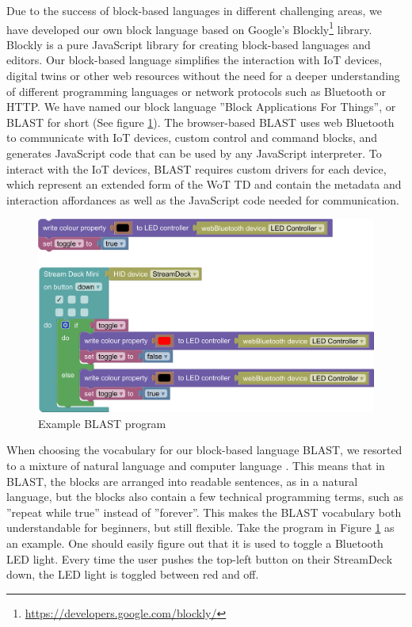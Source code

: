 \documentclass[runningheads]{llncs}
\begin{document}
Due to the success of block-based languages in different challenging areas, we have developed our own block language based on Google's Blockly\footnote{\url{https://developers.google.com/blockly/}} library. %
Blockly is a pure JavaScript library for creating block-based languages and editors.
Our block-based language simplifies the interaction with IoT devices, digital twins or other web resources without the need for a deeper understanding of different programming languages or network protocols such as Bluetooth or HTTP.
We have named our block language ''Block Applications For Things'', or BLAST for short (See figure \ref{fig1}).
The browser-based BLAST uses web Bluetooth to communicate with IoT devices, custom control and command blocks, and generates JavaScript code that can be used by any JavaScript interpreter.
To interact with the IoT devices, BLAST requires custom drivers for each device, which represent an extended form of the WoT TD %
 and contain the metadata and interaction affordances as well as the JavaScript code needed for communication.

\begin{figure}
\includegraphics[width=\textwidth]{screenshot.png}%
\caption{Example BLAST program} \label{fig1}
\end{figure}

When choosing the vocabulary for our block-based language BLAST, we resorted to a mixture of natural language and computer language \cite{8120404}.
This means that in BLAST, the blocks are arranged into readable sentences, as in a natural language, but the blocks also contain a few technical programming terms, such as ''repeat while true'' instead of ''forever''.
This makes the BLAST vocabulary both understandable for beginners, but still flexible. Take the program in Figure \ref{fig1} as an example. One should easily figure out that it is used to toggle a Bluetooth LED light. Every time the user pushes the top-left button on their StreamDeck down, the LED light is toggled between red and off.
\end{document}
